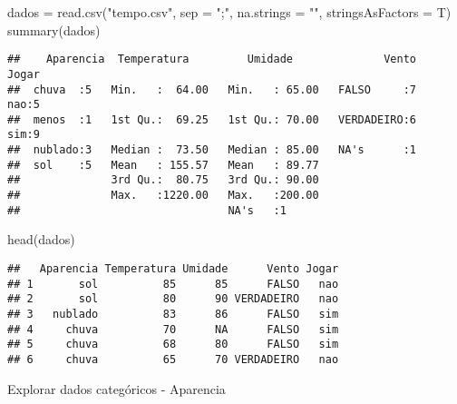 \documentclass[
]{article}
\author{}
\date{\vspace{-2.5em}}
\newenvironment{Shaded}{\begin{snugshade}}{\end{snugshade}}
\newcommand{\AttributeTok}[1]{\textcolor[rgb]{0.77,0.63,0.00}{#1}}
\newcommand{\FunctionTok}[1]{\textcolor[rgb]{0.00,0.00,0.00}{#1}}
\newcommand{\NormalTok}[1]{#1}
\newcommand{\OtherTok}[1]{\textcolor[rgb]{0.56,0.35,0.01}{#1}}
\newcommand{\SpecialCharTok}[1]{\textcolor[rgb]{0.00,0.00,0.00}{#1}}
\newcommand{\StringTok}[1]{\textcolor[rgb]{0.31,0.60,0.02}{#1}}
\begin{document}
\begin{Shaded}
\begin{Highlighting}[]
\NormalTok{dados }\OtherTok{=} \FunctionTok{read.csv}\NormalTok{(}\StringTok{"tempo.csv"}\NormalTok{, }\AttributeTok{sep =} \StringTok{";"}\NormalTok{, }\AttributeTok{na.strings =} \StringTok{""}\NormalTok{, }\AttributeTok{stringsAsFactors =}\NormalTok{ T)}
\FunctionTok{summary}\NormalTok{(dados)}
\end{Highlighting}
\end{Shaded}

\begin{verbatim}
##    Aparencia  Temperatura         Umidade              Vento   Jogar  
##  chuva  :5   Min.   :  64.00   Min.   : 65.00   FALSO     :7   nao:5  
##  menos  :1   1st Qu.:  69.25   1st Qu.: 70.00   VERDADEIRO:6   sim:9  
##  nublado:3   Median :  73.50   Median : 85.00   NA's      :1          
##  sol    :5   Mean   : 155.57   Mean   : 89.77                         
##              3rd Qu.:  80.75   3rd Qu.: 90.00                         
##              Max.   :1220.00   Max.   :200.00                         
##                                NA's   :1
\end{verbatim}

\begin{Shaded}
\begin{Highlighting}[]
\FunctionTok{head}\NormalTok{(dados)}
\end{Highlighting}
\end{Shaded}

\begin{verbatim}
##   Aparencia Temperatura Umidade      Vento Jogar
## 1       sol          85      85      FALSO   nao
## 2       sol          80      90 VERDADEIRO   nao
## 3   nublado          83      86      FALSO   sim
## 4     chuva          70      NA      FALSO   sim
## 5     chuva          68      80      FALSO   sim
## 6     chuva          65      70 VERDADEIRO   nao
\end{verbatim}

Explorar dados categóricos - Aparencia

\begin{Shaded}
\end{Shaded}
\end{document}
